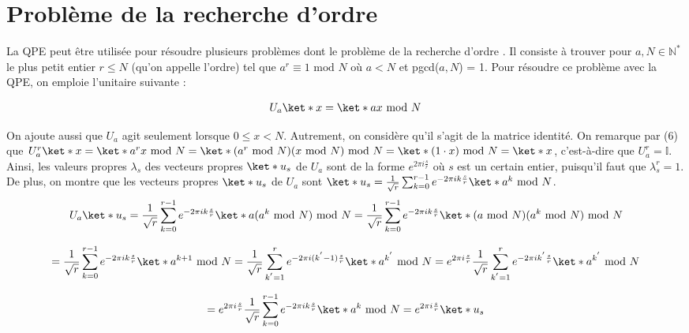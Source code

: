 \section{Problème de la recherche d'ordre}
La QPE peut être utilisée pour résoudre plusieurs problèmes dont le problème de la recherche d'ordre \cite{nielsen00}. Il consiste à trouver pour $a,N \in \mathbb{N}^*$ le plus petit entier $r \leq N$ (qu'on appelle l'ordre) tel que $a^r \equiv 1\text{ mod } N$ où $a < N$ et pgcd($a, N$) = 1. Pour résoudre ce problème avec la QPE, on emploie l'unitaire suivante : 

\begin{equation}
    U_a\ket*{x} = \ket*{ax \text{ mod } N}
\end{equation}

On ajoute aussi que $U_a$ agit seulement lorsque $0 \leq x < N$. Autrement, on considère qu'il s'agit de la matrice identité. On remarque par (6) que $U_a^r\ket*{x} = \ket*{a^r x \text{ mod } N} = \ket*{(a^r \text{ mod } N)(x \text{ mod } N)\text{ mod } N} = \ket*{(1\cdot x) \text{ mod } N} = \ket*{x}$, c'est-à-dire que $U_a^r = \mathbb{I}$. Ainsi, les valeurs propres $\lambda_s$ des vecteurs propres $\ket*{u_s}$ de $U_a$ sont de la forme $e^{2\pi i \frac{s}{r}}$ où $s$ est un certain entier, puisqu'il faut que $\lambda_s^r = 1$. De plus, on montre que les vecteurs propres $\ket*{u_s}$ de $U_a$ sont $\ket*{u_s} = \frac{1}{\sqrt{r}}\sum_{k=0}^{r-1}e^{-2\pi ik\frac{s}{r}}\ket*{a^k \text{ mod } N}$.
\begin{equation*}
    U_a\ket*{u_s} = \frac{1}{\sqrt{r}}\sum_{k=0}^{r-1}e^{-2\pi ik\frac{s}{r}}\ket*{a (a^{k} \text{ mod } N) \text{ mod } N} = \frac{1}{\sqrt{r}}\sum_{k=0}^{r-1}e^{-2\pi ik\frac{s}{r}}\ket*{(a \text{ mod } N) (a^{k} \text{ mod } N) \text{ mod } N}
\end{equation*}

\begin{equation*}
    = \frac{1}{\sqrt{r}}\sum_{k=0}^{r-1}e^{-2\pi ik\frac{s}{r}}\ket*{a^{k+1} \text{ mod } N} = \frac{1}{\sqrt{r}}\sum_{k^{'}=1}^{r}e^{-2\pi i(k^{'}-1)\frac{s}{r}}\ket*{a^{k^{'}}\text{ mod } N} = e^{2\pi i \frac{s}{r}} \frac{1}{\sqrt{r}}\sum_{k^{'}=1}^{r}e^{-2\pi ik^{'}\frac{s}{r}}\ket*{a^{k^{'}}\text{ mod } N}
\end{equation*}

\begin{equation*}
    = e^{2\pi i \frac{s}{r}}\frac{1}{\sqrt{r}}\sum_{k=0}^{r-1}e^{-2\pi ik\frac{s}{r}}\ket*{a^{k} \text{ mod } N} = e^{2\pi i \frac{s}{r}} \ket*{u_s}
\end{equation*}

